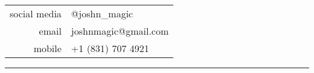 \documentclass[11pt,a4paper]{memoir}
\begin{document}
\begin{Spacing}{.75}
        \begin{minipage}[t]{42mm}
        \begin{flushleft}
        {\tiny
        	\begin{tabular}{rl}
            	{\color{gray}social media} & @joshn\_magic\\
            	{\color{gray}email} & joshnmagic@gmail.com\\
            	{\color{gray}mobile} & +1 (831) 707 4921\\
            \end{tabular}
            \vspace*{2mm}
        }
        \end{flushleft}
    \end{minipage}
    \rule{74mm}{0mm}\\
    \end{Spacing}
\end{document}
